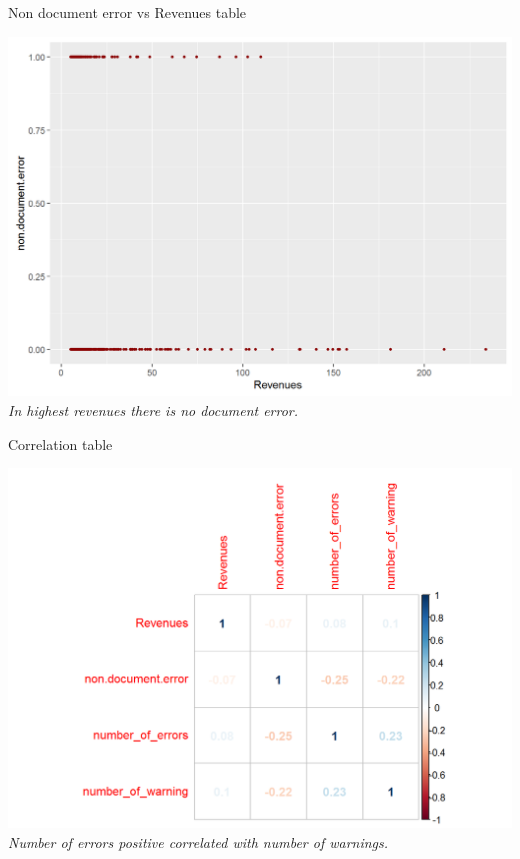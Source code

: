 \documentclass{book}
\begin{document}
\begin{table}[H]
\centering
\caption{Non document error vs Revenues table}
\begin{center}
\includegraphics[scale=0.5]{../R/photos/49_nde_rev.png}    \\
\textit{In highest revenues there is no document error.}
\end{center}
\end{table}
\begin{table}[H]
\centering
\caption{Correlation table}
\begin{center}
\includegraphics[scale=0.5]{../R/photos/51_HTML_cor.png}    \\
\textit{Number of errors positive correlated with number of warnings.}
\end{center}
\end{table}
\end{document}
